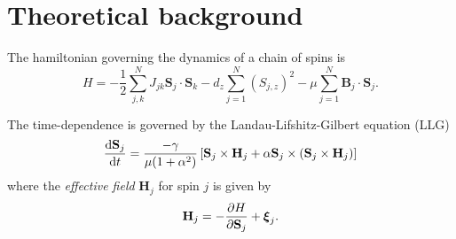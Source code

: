 \section{Theoretical background}

The hamiltonian governing the dynamics of a chain of spins is
\begin{equation}\label{eq:hamiltionian}
	H = - \frac{1}{2} \sum_{j,k}^{N} J_{jk} \mathbf{S}_j \cdot \mathbf{S}_k - d_z \sum_{j=1}^{N} (S_{j,z})^2 - \mu \sum_{j=1}^{N} \mathbf{B}_j \cdot \mathbf{S}_j.
\end{equation}

The time-dependence is governed by the Landau-Lifshitz-Gilbert equation (LLG) 
\begin{equation}\label{eq:llg}
	\frac{\text{d} \mathbf{S}_j}{\text{d} t} = \frac{-\gamma}{\mu(1 + \alpha^2)} \left[ \mathbf{S}_j \times \mathbf{H}_j + \alpha \mathbf{S}_j \times (\mathbf{S}_j \times \mathbf{H}_j) \right]
\end{equation}
where the \textit{effective field} $\mathbf{H}_j$ for spin $j$ is given by
\begin{equation}\label{eq:ef_field}
	\mathbf{H}_j = -\frac{\partial H}{\partial \mathbf{S}_j} + \boldsymbol{\xi}_j.
\end{equation}

